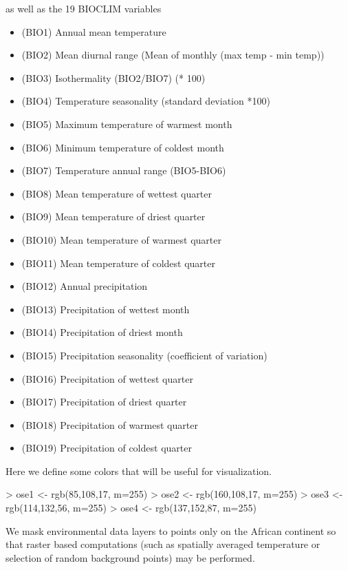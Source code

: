 \documentclass[10pt]{article}
\renewenvironment{Schunk}{\vspace{\topsep}}{\vspace{\topsep}}
\begin{document}
as well as the 19 BIOCLIM variables

\begin{itemize}
\item (BIO1) Annual mean temperature
\item (BIO2) Mean diurnal range (Mean of monthly (max temp - min temp))
\item (BIO3) Isothermality (BIO2/BIO7) (* 100)
\item (BIO4) Temperature seasonality (standard deviation *100)
\item (BIO5) Maximum temperature of warmest month
\item (BIO6) Minimum temperature of coldest month
\item (BIO7) Temperature annual range (BIO5-BIO6)
\item (BIO8) Mean temperature of wettest quarter
\item (BIO9) Mean temperature of driest quarter
\item (BIO10) Mean temperature of warmest quarter
\item (BIO11) Mean temperature of coldest quarter
\item (BIO12) Annual precipitation
\item (BIO13) Precipitation of wettest month
\item (BIO14) Precipitation of driest month
\item (BIO15) Precipitation seasonality (coefficient of variation)
\item (BIO16) Precipitation of wettest quarter
\item (BIO17) Precipitation of driest quarter
\item (BIO18) Precipitation of warmest quarter
\item (BIO19) Precipitation of coldest quarter
\end{itemize}

Here we define some colors that will be useful for visualization.

\begin{Schunk}
\begin{Sinput}
> ose1 <- rgb(85,108,17, m=255)
> ose2 <- rgb(160,108,17, m=255)
> ose3 <- rgb(114,132,56, m=255)
> ose4 <- rgb(137,152,87, m=255)
\end{Sinput}
\end{Schunk}

We mask environmental data layers to points only on the African continent so that raster based computations (such as spatially averaged temperature or selection of random background points) may be performed.
\end{document}
